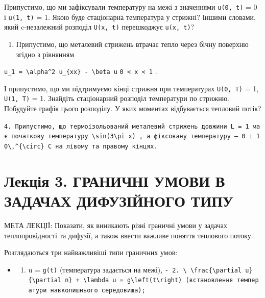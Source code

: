 \documentclass[
  ukrainian,
]{article}
\providecommand{\tightlist}{%
  \setlength{\itemsep}{0pt}\setlength{\parskip}{0pt}}
\begin{document}
Припустимо, що ми зафіксували температуру на межі з значеннями
\texttt{u(0,\ t)} = 0 і \texttt{u(1,\ t)} = 1. Якою буде стаціонарна
температура у стрижні? Іншими словами, який c-незалежний розподіл
\texttt{U(x,\ t)} перешкоджує \texttt{u(x,\ t)}?

\begin{enumerate}
\def\labelenumi{\arabic{enumi}.}
\setcounter{enumi}{2}
\tightlist
\item
  Припустимо, що металевий стрижень втрачає тепло через бічну поверхню
  згідно з рівнянням
\end{enumerate}

\texttt{u\_1\ =\ \textbackslash{}alpha\^{}2\ u\_\{xx\}\ -\ \textbackslash{}beta\ u}
\texttt{0\ \textless{}\ x\ \textless{}\ 1} .

І припустимо, що ми підтримуємо кінці стрижня при температурах
\texttt{U(0,\ T)} = 1, \texttt{U(1,\ T)} = 1. Знайдіть стаціонарний
розподіл температури по стрижню. Побудуйте графік цього розподілу. У
яких моментах відбувається тепловий потік?

\texttt{4.\ Припустимо,\ що\ термоізольований\ металевий\ стрижень\ довжини\ L\ =\ 1\ має\ початкову\ температуру\ \textquotesingle{}\textbackslash{}sin(3\textbackslash{}pi\ x)\textquotesingle{}\ ,\ а\ фіксовану\ температуру\ —\ 0\ і\ \textquotesingle{}10\textbackslash{},\^{}\{\textbackslash{}circ\}\textquotesingle{}\ C\ на\ лівому\ та\ правому\ кінцях.}

\section{Лекція 3. ГРАНИЧНІ УМОВИ В ЗАДАЧАХ ДИФУЗІЙНОГО
ТИПУ}\label{ux43bux435ux43aux446ux456ux44f-3.-ux433ux440ux430ux43dux438ux447ux43dux456-ux443ux43cux43eux432ux438-ux432-ux437ux430ux434ux430ux447ux430ux445-ux434ux438ux444ux443ux437ux456ux439ux43dux43eux433ux43e-ux442ux438ux43fux443}

МЕТА ЛЕКЦІЇ: Показати, як виникають різні граничні умови у задачах
теплопровідності та дифузії, а також ввести важливе поняття теплового
потоку.

Розглядаються три найважливіші типи граничних умов:

\begin{itemize}
\tightlist
\item
  \begin{enumerate}
  \def\labelenumi{\arabic{enumi}.}
  \tightlist
  \item
    u = \texttt{g(t)} (температура задається на межі),
    \texttt{-\ \textquotesingle{}2.\ \textbackslash{}\ \textbackslash{}frac\{\textbackslash{}partial\ u\}\{\textbackslash{}partial\ n\}\ +\ \textbackslash{}lambda\ u\ =\ g\textbackslash{}left(t\textbackslash{}right)\textquotesingle{}\ (встановлення\ температури\ навколишнього\ середовища);}
  \end{enumerate}
\end{itemize}
\end{document}

